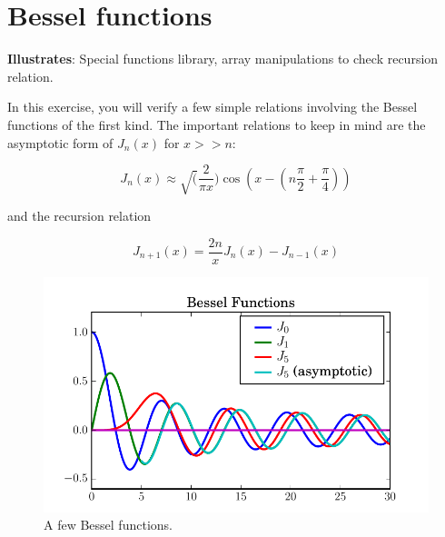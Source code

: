 \section{Bessel functions}
\label{sec:bessel}

\textbf{Illustrates}: Special functions library, array manipulations
to check recursion relation.


In this exercise, you will verify a few simple relations involving the Bessel
functions of the first kind.  The important relations to keep in mind are the
asymptotic form of $J_n(x)$ for $x>>n$:

\begin{equation}
J_n(x) \approx \sqrt(\frac{2}{\pi x})\cos(x-(n\frac{\pi}{2}+\frac{\pi}{4}))
\end{equation}

%
and the recursion relation

\begin{equation}
J_{n+1}(x) = \frac{2n}{x} J_n(x)-J_{n-1}(x)
\end{equation}

\begin{figure}
\begin{centering}
\includegraphics[width=5in]{fig/bessel_functions}
\par
\end{centering}


\caption{\label{fig:bessel_functions}A few Bessel functions.}

\end{figure}



